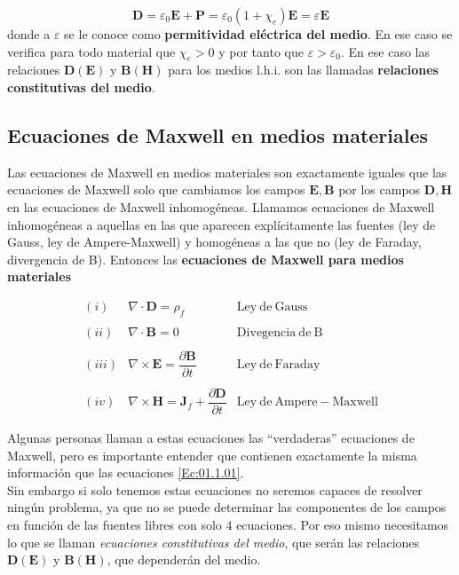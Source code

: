 \documentclass[12pt,a4paper]{article}
\newcommand{\rota}{\nabla \times}
\newcommand{\dive}{\nabla \cdot}
\newcommand{\Bn}{\mathbf{B}}
\newcommand{\En}{\mathbf{E}}
\newcommand{\Dn}{\mathbf{D}}
\newcommand{\Hn}{\mathbf{H}}
\newcommand{\Jn}{\mathbf{J}}
\newcommand{\Pn}{\mathbf{P}}
\numberwithin{equation}{section}
\numberwithin{figure}{section}
\begin{document}
\begin{equation}
\Dn = \varepsilon_0 \En + \Pn = \varepsilon_0(1+\chi_e) \En = \varepsilon \En \label{Ec:01.4.32}
\end{equation}
donde a $\varepsilon$ se le conoce como \textbf{permitividad eléctrica del medio}. En ese caso se verifica para todo material que $\chi_e>0$ y por tanto que $\varepsilon>\varepsilon_0$. En ese caso las relaciones $\Dn ( \En)$ y $\Bn ( \Hn)$ para los medios l.h.i. son las llamadas \textbf{relaciones constitutivas del medio}.

\subsection{Ecuaciones de Maxwell en medios materiales}

Las ecuaciones de Maxwell en medios materiales son exactamente iguales que las ecuaciones de Maxwell solo que cambiamos los campos $\En,\Bn$ por los campos $\Dn,\Hn$ en las ecuaciones de Maxwell inhomogéneas. Llamamos ecuaciones de Maxwell inhomogéneas a aquellas en las que aparecen explícitamente las fuentes (ley de Gauss, ley de Ampere-Maxwell) y homogéneas a las que no (ley de Faraday, divergencia de B). Entonces las \textbf{ecuaciones de Maxwell para medios materiales}

\begin{equation}
\begin{array}{rll}
(i) & \dive \Dn =  \rho_f & \mathrm{Ley \ de \ Gauss} \\ \\
(ii) & \dive \Bn = 0  & \mathrm{Divegencia \ de \ B} \\ \\
(iii) & \rota \En = \dfrac{\partial \Bn}{ \partial t}  & \mathrm{Ley \ de \ Faraday} \\ \\
(iv) & \rota \Hn=  \Jn_f +  \dfrac{\partial \Dn}{\partial t} & \mathrm{Ley \ de \ Ampere-Maxwell} 
\end{array} \label{Ec:01.5.31}
\end{equation}

Algunas personas llaman a estas ecuaciones las ``verdaderas'' ecuaciones de Maxwell, pero es importante entender que contienen exactamente la misma información que las ecuaciones \ref{Ec:01.1.01}. \\

 Sin embargo si solo tenemos estas ecuaciones no seremos capaces de resolver ningún problema, ya que no se puede determinar las componentes de los campos en función de las fuentes libres con solo 4 ecuaciones. Por eso mismo necesitamos lo que se llaman \textit{ecuaciones constitutivas del medio}, que serán las relaciones $\Dn(\En)$ y $\Bn (\Hn)$, que dependerán del medio. \\
 
\end{document}
